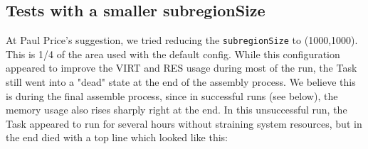 \documentclass[modern]{aastex61}
\begin{document}
\subsection{Tests with a smaller subregionSize}
At Paul Price's suggestion, we tried reducing the {\tt\string subregionSize} to (1000,1000). This is 1/4 of the area used with the default config. While this configuration appeared to improve the VIRT and RES usage during most of the run, the Task still went into a "dead" state at the end of the assembly process. We believe this is during the final assemble process, since in successful runs (see below), the memory usage also rises sharply right at the end. In this unsuccessful run, the Task appeared to run for several hours without straining system resources, but in the end died with a top line which looked like this:
\end{document}

